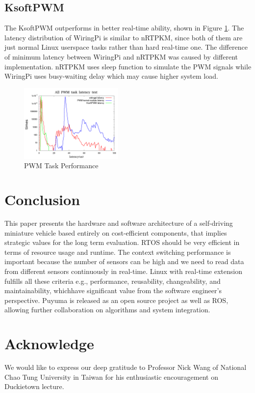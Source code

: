 \documentclass[conference]{IEEEtran}
\begin{document}
\subsection{KsoftPWM}

The KsoftPWM outperforms in better real-time ability, shown in Figure \ref{fig:ksoftpwm_perf}. The latency distribution of WiringPi is similar to nRTPKM, since both of them are just normal Linux userspace tasks rather than hard real-time one. The difference of minimum latency between WiringPi and nRTPKM was caused by different implementation. nRTPKM uses sleep function to simulate the PWM signals while WiringPi uses busy-waiting delay which may cause higher system load.

\begin{figure}
	\centering
	\includegraphics[width=2in]{img/ksoftpwm_load.png}
	\caption{PWM Task Performance}
	\label{fig:ksoftpwm_perf}
\end{figure}

\section{Conclusion}

This paper presents the hardware and software architecture of a self-driving miniature vehicle based entirely on cost-efficient components, that implies strategic values for the long term evaluation. RTOS should be very efficient in terms of resource usage and runtime. The context switching performance is important because the number of sensors can be high and we need to read data from different sensors continuously in real-time. Linux with real-time extension  fulfills all these criteria e.g., performance, reusability, changeability, and maintainability, whichhave significant value from the software engineer's perspective. Puyuma is released as an open source project as well as ROS, allowing further collaboration on algorithms and system integration.

\section{Acknowledge}

We would like to express our deep gratitude to Professor Nick Wang of National Chao Tung University in Taiwan for his enthusiastic encouragement on Duckietown lecture.



\end{document}
